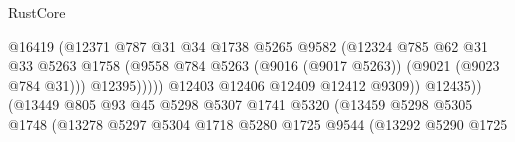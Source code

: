 \begin{lexlean}{RustCore}
\begin{coremodule}
                                                  @16419
                                                  (@12371
                                                    @787
                                                    @31
                                                    @34
                                                    @1738
                                                    @5265
                                                    @9582
                                                    (@12324
                                                      @785
                                                      @62
                                                      @31
                                                      @33
                                                      @5263
                                                      @1758
                                                      (@9558
                                                        @784
                                                        @5263
                                                        (@9016 (@9017 @5263))
                                                        (@9021 (@9023 @784 @31)))
                                                      @12395)))))
                                            @12403
                                            @12406
                                            @12409
                                            @12412
                                            @9309))
                                        @12435))
                                    (@13449
                                      @805
                                      @93
                                      @45
                                      @5298
                                      @5307
                                      @1741
                                      @5320
                                      (@13459
                                        @5298
                                        @5305
                                        @1748
                                        (@13278
                                          @5297
                                          @5304
                                          @1718
                                          @5280
                                          @1725
                                          @9544
                                          (@13292
                                            @5290
                                            @1725

\end{coremodule}
\end{lexlean}
